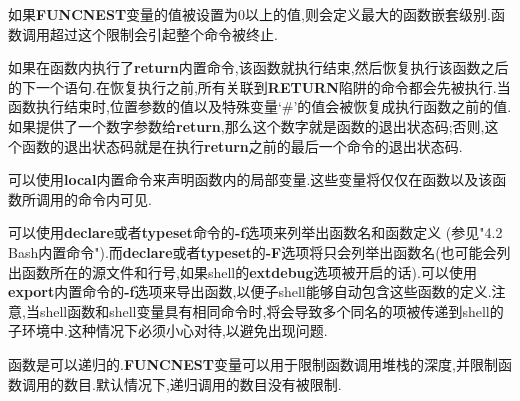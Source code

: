 \documentclass[draft,openany]{book}
\begin{document}
\begin{CJK}{UTF8}{gbsn}
    如果\textbf{FUNCNEST}变量的值被设置为0以上的值,则会定义最大的函数嵌套级别.函数调用超过这个限制会引起整个命令被终止.\par
    如果在函数内执行了\textbf{return}内置命令,该函数就执行结束,然后恢复执行该函数之后的下一个语句.在恢复执行之前,所有关联到\textbf{RETURN}陷阱的命令都会先被执行.当函数执行结束时,位置参数的值以及特殊变量`\#'的值会被恢复成执行函数之前的值.如果提供了一个数字参数给\textbf{return},那么这个数字就是函数的退出状态码;否则,这个函数的退出状态码就是在执行\textbf{return}之前的最后一个命令的退出状态码.\par
    可以使用\textbf{local}内置命令来声明函数内的局部变量.这些变量将仅仅在函数以及该函数所调用的命令内可见.\par
    可以使用\textbf{declare}或者\textbf{typeset}命令的\textbf{-f}选项来列举出函数名和函数定义 (参见"4.2 Bash内置命令").而\textbf{declare}或者\textbf{typeset}的\textbf{-F}选项将只会列举出函数名(也可能会列出函数所在的源文件和行号,如果shell的\textbf{extdebug}选项被开启的话).可以使用\textbf{export}内置命令的\textbf{-f}选项来导出函数,以便子shell能够自动包含这些函数的定义.注意,当shell函数和shell变量具有相同命令时,将会导致多个同名的项被传递到shell的子环境中.这种情况下必须小心对待,以避免出现问题.\par
    函数是可以递归的.\textbf{FUNCNEST}变量可以用于限制函数调用堆栈的深度,并限制函数调用的数目.默认情况下,递归调用的数目没有被限制.


\end{CJK}
\end{document}
